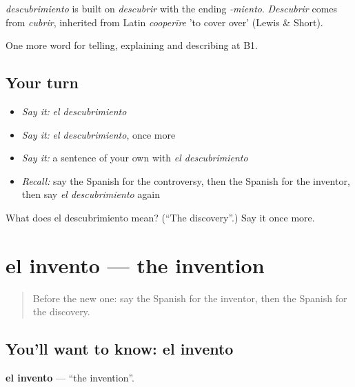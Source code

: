 \begin{cousinweb}
\emph{descubrimiento} is built on \emph{descubrir} with the ending \emph{-miento}. \emph{Descubrir} comes from \emph{cubrir}, inherited from Latin \emph{cooperīre} 'to cover over' (Lewis \& Short).
\end{cousinweb}

\begin{grammarlens}[title={What you've built}]
One more word for telling, explaining and describing at B1.
\end{grammarlens}

\subsection*{Your turn}
\begin{itemize}
\raggedright
  \item \emph{Say it:} \emph{el descubrimiento}
  \item \emph{Say it:} \emph{el descubrimiento}, once more
  \item \emph{Say it:} a sentence of your own with \emph{el descubrimiento}
  \item \emph{Recall:} say the Spanish for the controversy, then the Spanish for the inventor, then say \emph{el descubrimiento} again
\end{itemize}

\begin{tcolorbox}[breakable,colback=teal!4,colframe=teal!35!black,title={Before you move on}]
What does el descubrimiento mean? (\textquotedblleft{}The discovery\textquotedblright{}.) Say it once more.
\end{tcolorbox}
\section[el invento]{el invento — the invention}

\label{lesson:ES-C571-invento}



\begin{quote}
Before the new one: say the Spanish for the inventor, then the Spanish for the discovery.
\end{quote}

\subsection*{You'll want to know: el invento}
\textbf{el invento} — \textquotedblleft{}the invention\textquotedblright{}.

